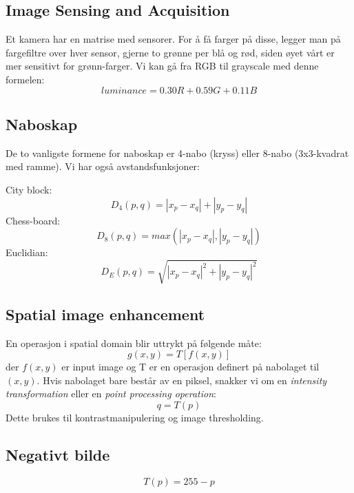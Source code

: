\subsection{Image Sensing and Acquisition}
Et kamera har en matrise med sensorer. For å få farger på disse, legger man på fargefiltre over hver sensor, gjerne to grønne per blå og rød, siden øyet vårt er mer sensitivt for grønn-farger. Vi kan gå fra RGB til grayscale med denne formelen:
\begin{equation}
    luminance = 0.30R + 0.59G + 0.11B
\end{equation}
\subsection{Naboskap}
De to vanligste formene for naboskap er 4-nabo (kryss) eller 8-nabo (3x3-kvadrat med ramme). Vi har også avstandsfunksjoner:

City block:
\begin{equation}
D_4(p,q) = |x_p - x_q| + | y_p - y_q |
\end{equation}
Chess-board:
\begin{equation}
D_8(p,q) = max(|x_p - x_q|, |y_p - y_q|)
\end{equation}
Euclidian:
\begin{equation}
D_E(p,q) = \sqrt{|x_p - x_q|^2 + |y_p - y_q|^2}
\end{equation}

\subsection{Spatial image enhancement}
En operasjon i spatial domain blir uttrykt på følgende måte:
\begin{equation}
    g(x,y) = T[f(x,y)]
\end{equation}
der $f(x,y)$ er input image og T er en operasjon definert på nabolaget til $(x,y)$. Hvis nabolaget bare består av en piksel, snakker vi om en \emph{intensity transformation} eller en \emph{point processing operation}:
\begin{equation}
    q = T(p)
\end{equation}
Dette brukes til kontrastmanipulering og image thresholding.

\subsection{Negativt bilde}
\begin{equation}
T(p) = 255-p
\end{equation}

